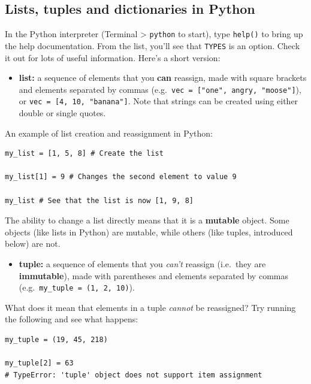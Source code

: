 \documentclass[
]{book}
\providecommand{\tightlist}{%
  \setlength{\itemsep}{0pt}\setlength{\parskip}{0pt}}
\begin{document}
\hypertarget{lists-tuples-and-dictionaries-in-python}{%
\subsection{Lists, tuples and dictionaries in Python}\label{lists-tuples-and-dictionaries-in-python}}

In the Python interpreter (Terminal \textgreater{} \texttt{python} to start), type \texttt{help()} to bring up the help documentation. From the list, you'll see that \texttt{TYPES} is an option. Check it out for lots of useful information. Here's a short version:

\begin{itemize}
\tightlist
\item
  \textbf{list:} a sequence of elements that you \textbf{can} reassign, made with square brackets and elements separated by commas (e.g.~\texttt{vec\ =\ {[}"one",\ \textquotesingle{}angry\textquotesingle{},\ "moose"{]}}), or \texttt{vec\ =\ {[}4,\ 10,\ "banana"{]}}. Note that strings can be created using either double or single quotes.
\end{itemize}

An example of list creation and reassignment in Python:

\begin{verbatim}
my_list = [1, 5, 8] # Create the list

my_list[1] = 9 # Changes the second element to value 9

my_list # See that the list is now [1, 9, 8]
\end{verbatim}

The ability to change a list directly means that it is a \textbf{mutable} object. Some objects (like lists in Python) are mutable, while others (like tuples, introduced below) are not.

\begin{itemize}
\tightlist
\item
  \textbf{tuple:} a sequence of elements that you \emph{can't} reassign (i.e.~they are \textbf{immutable}), made with parentheses and elements separated by commas (e.g.~\texttt{my\_tuple\ =\ (1,\ 2,\ 10)}).
\end{itemize}

What does it mean that elements in a tuple \emph{cannot} be reassigned? Try running the following and see what happens:

\begin{verbatim}
my_tuple = (19, 45, 218)

my_tuple[2] = 63
# TypeError: 'tuple' object does not support item assignment
\end{verbatim}
\end{document}
